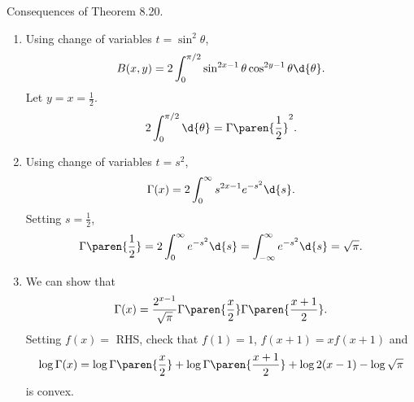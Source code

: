 \rmk Consequences of {\sffamily Theorem 8.20}.
\begin{enumerate}
    \item Using change of variables \(t = \sin^2 \theta\),
          \[
              B(x, y) = 2 \int_0^{\pi/2} \sin^{2x-1}\theta \cos^{2y-1}\theta \d{\theta}.
          \]
          Let \(y = x = \frac{1}{2}\).
          \[
              2 \int_0^{\pi/2}\d{\theta} = \Gamma\paren{\frac{1}{2}}^2.
          \]
    \item Using change of variables \(t = s^2\),
          \[
              \Gamma(x) = 2 \int_0^\infty s^{2x-1}e^{-s^2} \d{s}.
          \]
          Setting \(s = \frac{1}{2}\),
          \[
              \Gamma\paren{\frac{1}{2}} = 2 \int_0^\infty e^{-s^2} \d{s} = \int_{-\infty}^\infty e^{-s^2} \d{s} = \sqrt{\pi}.
          \]
    \item We can show that
          \[
              \Gamma(x) = \frac{2^{x-1}}{\sqrt{\pi}} \Gamma\paren{\frac{x}{2}} \Gamma \paren{\frac{x+1}{2}}.
          \]
          Setting \(f(x) = \) RHS, check that \(f(1) = 1\), \(f(x + 1) = xf(x + 1)\) and
          \[
              \log \Gamma(x) = \log \Gamma\paren{\frac{x}{2}} + \log \Gamma \paren{\frac{x+1}{2}} + \log 2(x - 1) - \log \sqrt{\pi}
          \]
          is convex.
\end{enumerate}

\pagebreak
